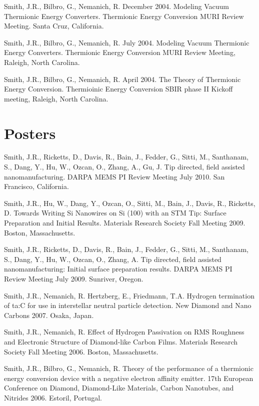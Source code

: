 \documentclass[letterpaper,margin,line]{res}
\begin{document}
\begin{resume}
Smith, J.R., Bilbro, G., Nemanich, R. December 2004. Modeling Vacuum Thermionic Energy Converters. Thermionic Energy Conversion MURI Review Meeting. Santa Cruz, California.

Smith, J.R., Bilbro, G., Nemanich, R. July 2004. Modeling Vacuum Thermionic Energy Converters. Thermionic Energy Conversion MURI Review Meeting, Raleigh, North Carolina.

Smith, J.R., Bilbro, G., Nemanich, R. April 2004. The Theory of Thermionic Energy Conversion. Thermioinic Energy Conversion SBIR phase II Kickoff meeting, Raleigh, North Carolina.

% 


\section{\sc Posters}
Smith, J.R., Ricketts, D., Davis, R., Bain, J., Fedder, G., Sitti, M., Santhanam, S., Dang, Y., Hu, W., Ozcan, O., Zhang, A., Gu, J. Tip directed, field assisted nanomanufacturing. DARPA MEMS PI Review Meeting July 2010. San Francisco, California.

Smith, J.R., Hu, W., Dang, Y., Ozcan, O., Sitti, M., Bain, J., Davis, R., Ricketts, D. Towards Writing Si Nanowires on Si (100) with an STM Tip: Surface Preparation and Initial Results. Materials Research Society Fall Meeting 2009. Boston, Massachusetts.

Smith, J.R., Ricketts, D., Davis, R., Bain, J., Fedder, G., Sitti, M., Santhanam, S., Dang, Y., Hu, W., Ozcan, O., Zhang, A. Tip directed, field assisted nanomanufacturing: Initial surface preparation results. DARPA MEMS PI Review Meeting July 2009. Sunriver, Oregon.

Smith, J.R., Nemanich, R. Hertzberg, E., Friedmann, T.A. Hydrogen termination of ta:C for use in interstellar neutral particle detection. New Diamond and Nano Carbons 2007. Osaka, Japan.

Smith, J.R., Nemanich, R. Effect of Hydrogen Passivation on RMS Roughness and Electronic Structure of Diamond-like Carbon Films. Materials Research Society Fall Meeting 2006. Boston, Massachusetts.

Smith, J.R., Bilbro, G., Nemanich, R. Theory of the performance of a thermionic energy conversion device with a negative electron affinity emitter. 17th European Conference on Diamond, Diamond-Like Materials, Carbon Nanotubes, and Nitrides 2006. Estoril, Portugal.


\end{resume}
\end{document}
